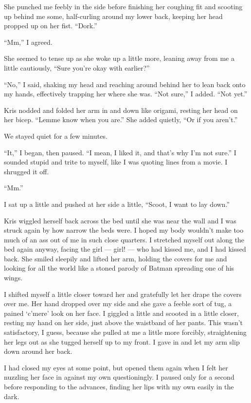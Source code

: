 She punched me feebly in the side before finishing her coughing fit and scooting up behind me some, half-curling around my lower back, keeping her head propped up on her fist.  ``Dork.''

``Mm,'' I agreed.

She seemed to tense up as she woke up a little more, leaning away from me a little cautiously, ``Sure you're okay with earlier?''

``No,'' I said, shaking my head and reaching around behind her to lean back onto my hands, effectively trapping her where she was.  ``Not sure,'' I added.  ``Not yet.''

Kris nodded and folded her arm in and down like origami, resting her head on her bicep.  ``Lemme know when you are.''  She added quietly, ``Or if you aren't.''

We stayed quiet for a few minutes.

``It,'' I began, then paused.  ``I mean, I liked it, and that's why I'm not sure.''  I sounded stupid and trite to myself, like I was quoting lines from a movie.  I shrugged it off.

``Mm.''

I sat up a little and pushed at her side a little, ``Scoot, I want to lay down.''

Kris wiggled herself back across the bed until she was near the wall and I was struck again by how narrow the beds were.  I hoped my body wouldn't make too much of an ass out of me in such close quarters.  I stretched myself out along the bed again anyway, facing the girl --- girl! --- who had kissed me, and I had kissed back.  She smiled sleepily and lifted her arm, holding the covers for me and looking for all the world like a stoned parody of Batman spreading one of his wings.

I shifted myself a little closer toward her and gratefully let her drape the covers over me.  Her hand dropped over my side and she gave a feeble sort of tug, a pained `c'mere' look on her face.  I giggled a little and scooted in a little closer, resting my hand on her side, just above the waistband of her pants.  This wasn't satisfactory, I guess, because she pulled at me a little more forcibly, straightening her legs out as she tugged herself up to my front.  I gave in and let my arm slip down around her back.

I had closed my eyes at some point, but opened them again when I felt her nuzzling her face in against my own questioningly.  I paused only for a second before responding to the advances, finding her lips with my own easily in the dark.

